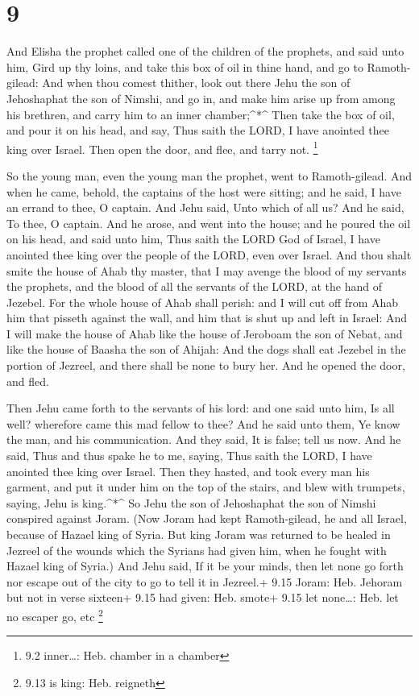 \hypertarget{section-8}{%
\section{9}\label{section-8}}

 And Elisha the prophet called one of the children of the
prophets, and said unto him, Gird up thy loins, and take this box of oil
in thine hand, and go to Ramoth-gilead:  And when thou
comest thither, look out there Jehu the son of Jehoshaphat the son of
Nimshi, and go in, and make him arise up from among his brethren, and
carry him to an inner chamber;\^{}*\^{}  Then take the box
of oil, and pour it on his head, and say, Thus saith the LORD, I have
anointed thee king over Israel. Then open the door, and flee, and tarry
not. \footnote{9.2 inner\ldots: Heb. chamber in a chamber}

 So the young man, even the young man the prophet, went to
Ramoth-gilead.  And when he came, behold, the captains of
the host were sitting; and he said, I have an errand to thee, O captain.
And Jehu said, Unto which of all us? And he said, To thee, O captain.
 And he arose, and went into the house; and he poured the
oil on his head, and said unto him, Thus saith the LORD God of Israel, I
have anointed thee king over the people of the LORD, even over Israel.
 And thou shalt smite the house of Ahab thy master, that I
may avenge the blood of my servants the prophets, and the blood of all
the servants of the LORD, at the hand of Jezebel.  For the
whole house of Ahab shall perish: and I will cut off from Ahab him that
pisseth against the wall, and him that is shut up and left in Israel:
 And I will make the house of Ahab like the house of
Jeroboam the son of Nebat, and like the house of Baasha the son of
Ahijah:  And the dogs shall eat Jezebel in the portion of
Jezreel, and there shall be none to bury her. And he opened the door,
and fled.

 Then Jehu came forth to the servants of his lord: and one
said unto him, Is all well? wherefore came this mad fellow to thee? And
he said unto them, Ye know the man, and his communication. 
And they said, It is false; tell us now. And he said, Thus and thus
spake he to me, saying, Thus saith the LORD, I have anointed thee king
over Israel.  Then they hasted, and took every man his
garment, and put it under him on the top of the stairs, and blew with
trumpets, saying, Jehu is king.\^{}*\^{}  So Jehu the son
of Jehoshaphat the son of Nimshi conspired against Joram. (Now Joram had
kept Ramoth-gilead, he and all Israel, because of Hazael king of Syria.
 But king Joram was returned to be healed in Jezreel of the
wounds which the Syrians had given him, when he fought with Hazael king
of Syria.) And Jehu said, If it be your minds, then let none go forth
nor escape out of the city to go to tell it in Jezreel.+ 9.15 Joram:
Heb. Jehoram but not in verse sixteen+ 9.15 had given: Heb. smote+ 9.15
let none\ldots: Heb. let no escaper go, etc \footnote{9.13 is king: Heb.
  reigneth}

